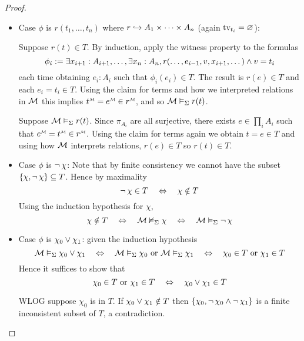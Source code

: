 \begin{proof}
\begin{itemize}
        \item Case $\phi$ is $r(t_1,\dots,t_n)$ 
            where $r \hookrightarrow A_1 \times \dots \times A_n$ (again $\textrm{tv}_{t_i} = \varnothing$):
            \begin{forward}
                Suppose $r(t) \in T$.
                By induction, 
                apply the witness property 
                to the formulas
                \[
                    \phi_i := \exists x_{i + 1} : A_{i+1}, \dots, 
                    \exists x_{n} : A_n, r(\dots, e_{i-1}, v , x_{i+1},\dots) 
                    \land v = t_i
                \]
                each time obtaining $e_i : A_i$ such that $\phi_i(e_i) \in T$.
                The result is $r(e) \in T$ and each
                $e_i = t_i \in T$.
                Using the claim for terms and 
                how we interpreted relations in $\mathcal{M}$ this implies
                $\mmintp{t} = \mmintp{e} \in \mmintp{r}$,
                and so $\mathcal{M} \vDash_{\Sigma} r(t)$.
            \end{forward}

            \begin{backward}
                Suppose $\mathcal{M} \vDash_{\Sigma} r(t)$.
                Since $\pi_{A_i}$ are all surjective, 
                there exists $e \in \prod_i A_i$ 
                such that $\mmintp{e} = \mmintp{t} \in \mmintp{r}$.
                Using the claim for terms again
                we obtain $t = e \in T$ and 
                using how $\mathcal{M}$ interprets relations,
                $r(e) \in T$ so
                $r(t) \in T$.
            \end{backward}
        
        \item Case $\phi$ is $\neg\, \chi$:
            Note that by finite consistency
            we cannot have the subset 
            $\left\{\chi,\neg\, \chi\right\} \subseteq T$.
            Hence by maximality
            \[\neg\, \chi \in T \quad \Leftrightarrow \quad \chi \notin T\]
            Using the induction hypothesis for $\chi$,
            \[
                \chi \notin T \quad \Leftrightarrow \quad 
                \mathcal{M} \nvDash_{\Sigma} \chi \quad \Leftrightarrow \quad
                \mathcal{M} \vDash_{\Sigma} \neg\, \chi
            \]

        \item Case $\phi$ is $\chi_0 \lor \chi_1$: 
            given the induction hypothesis
            \[
                \mathcal{M} \vDash_{\Sigma} \chi_0 \lor \chi_1 
                    \quad \Leftrightarrow \quad \mathcal{M} \vDash_{\Sigma} \chi_0
                    \text{ or } \mathcal{M} \vDash_{\Sigma} \chi_1 \\
                    \quad \Leftrightarrow \quad \chi_0 \in T \text{ or } \chi_1 \in T
            \]
            Hence it suffices to show that 
            \[
                \chi_0 \in T \text{ or } \chi_1 \in T
                \quad \Leftrightarrow \quad \chi_0 \lor \chi_1 \in T
            \]
            \begin{forward}
                WLOG suppose $\chi_0$ is in $T$.
                If $\chi_0 \lor \chi_1 \notin T$ then 
                $\left\{\chi_0, \neg\, \chi_0 \land \neg\, \chi_1\right\}$ is a finite
                inconsistent subset of $T$, a contradiction.
            \end{forward}


\end{itemize}
\end{proof}
